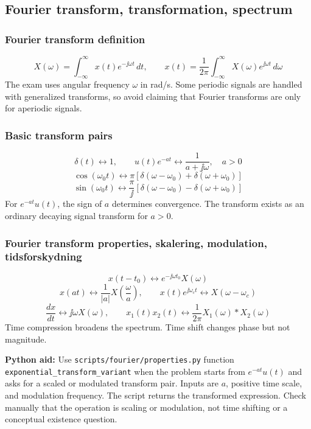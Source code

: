 \subsection{Fourier transform, transformation, spectrum}

\subsubsection{Fourier transform definition}
\[
X(\omega)=\int_{-\infty}^{\infty}x(t)e^{-\jj\omega t}\,dt,\qquad
x(t)=\frac{1}{2\pi}\int_{-\infty}^{\infty}X(\omega)e^{\jj\omega t}\,d\omega
\]
The exam uses angular frequency \(\omega\) in rad/s. Some periodic signals are handled with generalized transforms, so avoid claiming that Fourier transforms are only for aperiodic signals.

\subsubsection{Basic transform pairs}
\[
\delta(t)\leftrightarrow 1,\qquad
u(t)e^{-at}\leftrightarrow \frac{1}{a+\jj\omega},\quad a>0
\]
\[
\cos(\omega_0t)\leftrightarrow \pi\left[\delta(\omega-\omega_0)+\delta(\omega+\omega_0)\right]
\]
\[
\sin(\omega_0t)\leftrightarrow \frac{\pi}{\jj}\left[\delta(\omega-\omega_0)-\delta(\omega+\omega_0)\right]
\]
For \(e^{-at}u(t)\), the sign of \(a\) determines convergence. The transform exists as an ordinary decaying signal transform for \(a>0\).

\subsubsection{Fourier transform properties, skalering, modulation, tidsforskydning}
\[
x(t-t_0)\leftrightarrow e^{-\jj\omega t_0}X(\omega)
\]
\[
x(at)\leftrightarrow \frac{1}{|a|}X\left(\frac{\omega}{a}\right),\qquad
x(t)e^{\jj\omega_ct}\leftrightarrow X(\omega-\omega_c)
\]
\[
\frac{dx}{dt}\leftrightarrow \jj\omega X(\omega),\qquad
x_1(t)x_2(t)\leftrightarrow \frac{1}{2\pi}X_1(\omega)*X_2(\omega)
\]
Time compression broadens the spectrum. Time shift changes phase but not magnitude.

\textbf{Python aid:} Use \texttt{scripts/fourier/properties.py} function \texttt{exponential\_transform\_variant} when the problem starts from \(e^{-at}u(t)\) and asks for a scaled or modulated transform pair. Inputs are \(a\), positive time scale, and modulation frequency. The script returns the transformed expression. Check manually that the operation is scaling or modulation, not time shifting or a conceptual existence question.

